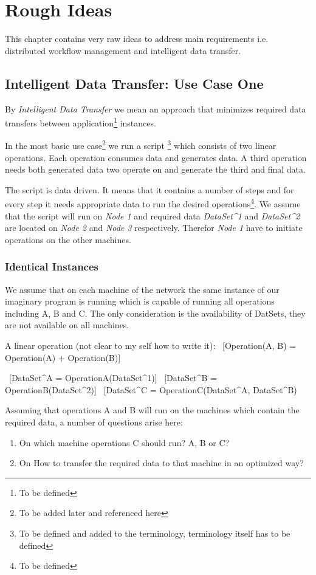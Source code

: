 \chapter{Rough Ideas}

This chapter contains very raw ideas to address main requirements i.e.
distributed workflow management and intelligent data transfer.

\section{Intelligent Data Transfer: Use Case One}
By \textit{Intelligent Data Transfer} we mean an approach that
minimizes required data transfers between application\footnote{To be defined}
instances.

In the most basic use case\footnote{To be added later and 
referenced here} we run a script
\footnote{To be defined and added to
the terminology, terminology itself has to be defined}
which consists of two linear operations. Each operation consumes data
and generates data. A third operation needs both generated data two 
operate on and generate the third and final data.

The script is data driven. It means that it contains a number
of steps and for every step it needs appropriate data to run the
desired operations\footnote{To be defined}. We assume that
the script will run on \textit{Node 1} and required data 
\textit{DataSet^1} and \textit{DataSet^2} are 
located on \textit{Node 2}
and \textit{Node 3} respectively. Therefor \textit{Node 1} have
to initiate operations on the other machines.

\subsection{Identical Instances}
We assume that on each machine of the network the same instance of our
imaginary program is running which is capable of running all operations
including A, B and C. The only consideration is the availability of 
DatSets, they are not available on all machines.

A linear operation (not clear to my self how to write it):
\ [Operation(A, B) = Operation(A) + Operation(B)]

\ [DataSet^A = OperationA(DataSet^1)]
\ [DataSet^B = OperationB(DataSet^2)]
\ [DataSet^C = OperationC(DataSet^A, DataSet^B)

Assuming that operations A and B will run on the machines which
contain the required data, a number of questions arise here:
\begin{enumerate}
\item On which machine operations C should run? A, B or C?
\item On How to transfer the required data to that machine in an 
optimized way?
\end{enumerate}

